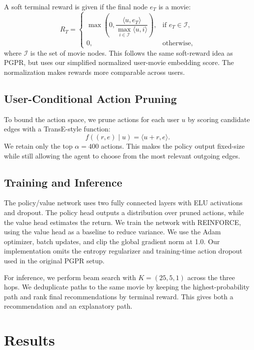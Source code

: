 \documentclass{article}
\begin{document}
A soft terminal reward is given if the final node $e_T$ is a movie:
\begin{equation}
    R_T =
    \begin{cases}
    \max\left(0, \dfrac{\langle u, e_T \rangle}{\max_{i \in \mathcal{I}} \langle u, i \rangle}\right), & \text{if } e_T \in \mathcal{I}, \\
    0, & \text{otherwise},
    \end{cases}
\end{equation}
where $\mathcal{I}$ is the set of movie nodes. This follows the same soft-reward idea as PGPR, but uses our simplified normalized user-movie embedding score. The normalization makes rewards more comparable across users.

\subsection{User-Conditional Action Pruning}

To bound the action space, we prune actions for each user $u$ by scoring candidate edges with a TransE-style function:
\begin{equation}
    f((r, e) \mid u) = \langle u + r, e \rangle .
\end{equation}
We retain only the top $\alpha=400$ actions. This makes the policy output fixed-size while still allowing the agent to choose from the most relevant outgoing edges.

\subsection{Training and Inference}

The policy/value network uses two fully connected layers with ELU activations and dropout. The policy head outputs a distribution over pruned actions, while the value head estimates the return. We train the network with REINFORCE, using the value head as a baseline to reduce variance. We use the Adam optimizer, batch updates, and clip the global gradient norm at 1.0. Our implementation omits the entropy regularizer and training-time action dropout used in the original PGPR setup.

For inference, we perform beam search with $K=(25,5,1)$ across the three hops. We deduplicate paths to the same movie by keeping the highest-probability path and rank final recommendations by terminal reward. This gives both a recommendation and an explanatory path.

\section{Results}
\end{document}
